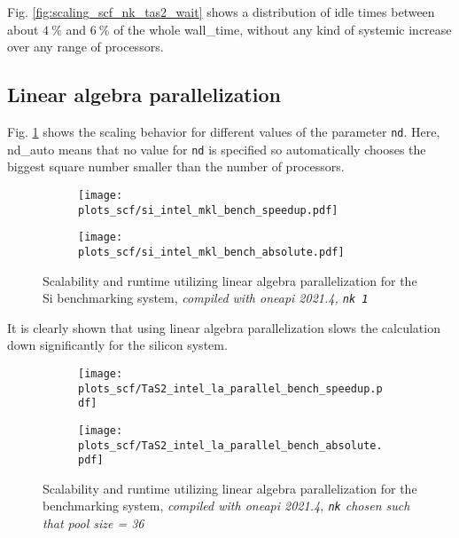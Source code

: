 \documentclass[main.tex]{subfiles}
\begin{document}
Fig. \ref{fig:scaling_scf_nk_tas2_wait} shows a distribution of idle times between about \(\SI{4}{\percent}\) and \(\SI{6}{\percent}\) of the whole \gls{wall_time}, without any kind of systemic increase over any range of processors.

\subsection{Linear algebra parallelization}

Fig. \ref{fig:scaling_scf_nd_si} shows the scaling behavior for different values of the parameter \texttt{nd}.
Here, nd\_auto means that no value for \texttt{nd} is specified so \QE automatically chooses the biggest square number smaller than the number of processors.
\begin{figure}[ht!]
\begin{subfigure}[b]{0.49\textwidth}
    \centering
    \texttt{[image: plots\_scf/si\_intel\_mkl\_bench\_speedup.pdf]}
\end{subfigure}
\begin{subfigure}[b]{0.49\textwidth}
    \centering
    \texttt{[image: plots\_scf/si\_intel\_mkl\_bench\_absolute.pdf]}
\end{subfigure}
\label{fig:scaling_scf_nd_si}
\caption{Scalability and runtime utilizing linear algebra parallelization for the Si benchmarking system, \emph{\QE compiled with \gls{oneapi} 2021.4, \texttt{nk 1}}}
\end{figure}
It is clearly shown that using linear algebra parallelization slows the calculation down significantly for the silicon system.

\begin{figure}[ht!]
\begin{subfigure}[b]{0.49\textwidth}
    \centering
    \texttt{[image: plots\_scf/TaS2\_intel\_la\_parallel\_bench\_speedup.pdf]}
\end{subfigure}
\begin{subfigure}[b]{0.49\textwidth}
    \centering
    \texttt{[image: plots\_scf/TaS2\_intel\_la\_parallel\_bench\_absolute.pdf]}
\end{subfigure}
\label{fig:scaling_scf_nd_tas2}
\caption{Scalability and runtime utilizing linear algebra parallelization for the \TaS benchmarking system, \emph{\QE compiled with \gls{oneapi} 2021.4, \texttt{nk} chosen such that pool size = 36}}
\end{figure}
\end{document}
